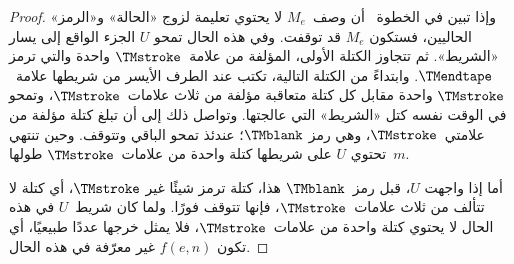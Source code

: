 \documentclass[../../../include/open-logic-section]{subfiles}
\begin{document}
\begin{proof}
  وإذا تبين في الخطوة~ أن وصف~$M_e$ لا يحتوي تعليمة
  لزوج «الحالة» و«الرمز» الحاليين، فستكون $M_e$ قد توقفت. وفي هذه
  الحال تمحو $U$ الجزء الواقع إلى يسار «الشريط». ثم تتجاوز الكتلة
  الأولى، المؤلفة من علامة~$\TMstroke$ واحدة والتي ترمز
  $\TMendtape$. وابتداءً من الكتلة التالية، تكتب عند الطرف الأيسر من
  شريطها علامة~$\TMstroke$ واحدة مقابل كل كتلة متعاقبة مؤلفة من ثلاث
  علامات~$\TMstroke$، وتمحو في الوقت نفسه كتل «الشريط» التي عالجتها.
  وتواصل ذلك إلى أن تبلغ كتلة مؤلفة من علامتي~$\TMstroke$، وهي رمز
  $\TMblank$؛ عندئذ تمحو الباقي وتتوقف. وحين تنتهي تحتوي $U$ على
  شريطها كتلة واحدة من علامات~$\TMstroke$ طولها~$m$.

  أما إذا واجهت $U$، قبل رمز~$\TMblank$ هذا، كتلة ترمز شيئًا غير
  $\TMstroke$، أي كتلة لا تتألف من ثلاث علامات~$\TMstroke$، فإنها
  تتوقف فورًا. ولما كان شريط~$U$ في هذه الحال لا يحتوي كتلة واحدة من
  علامات~$\TMstroke$، فلا يمثل خرجها عددًا طبيعيًا، أي تكون $f(e,n)$
  غير معرّفة في هذه الحال.
\end{proof}
\end{document}
